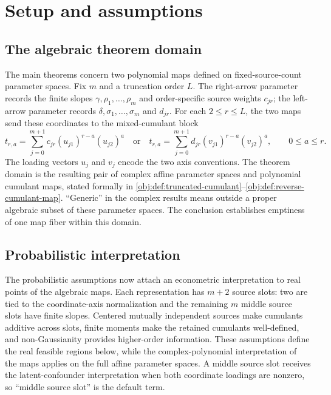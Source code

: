 \section{Setup and assumptions}

\subsection{The algebraic theorem domain}

The main theorems concern two polynomial maps defined on fixed-source-count parameter spaces. Fix \(m\) and a truncation order \(L\). The right-arrow parameter records the finite slopes \(\gamma,\rho_1,\ldots,\rho_m\) and order-specific source weights \(c_{jr}\); the left-arrow parameter records \(\delta,\sigma_1,\ldots,\sigma_m\) and \(d_{jr}\). For each \(2\le r\le L\), the two maps send these coordinates to the mixed-cumulant block
\[
t_{r,a}
=\sum_{j=0}^{m+1}c_{jr}(u_{j1})^{r-a}(u_{j2})^a
\quad\text{or}\quad
t_{r,a}
=\sum_{j=0}^{m+1}d_{jr}(v_{j1})^{r-a}(v_{j2})^a,
\qquad 0\le a\le r.
\]
The loading vectors \(u_j\) and \(v_j\) encode the two axis conventions. The theorem domain is the resulting pair of complex affine parameter spaces and polynomial cumulant maps, stated formally in \cref{obj:def:truncated-cumulant}--\cref{obj:def:reverse-cumulant-map}. ``Generic'' in the complex results means outside a proper algebraic subset of these parameter spaces. The conclusion establishes emptiness of one map fiber within this domain.

\subsection{Probabilistic interpretation}

The probabilistic assumptions now attach an econometric interpretation to real points of the algebraic maps. Each representation has \(m+2\) source slots: two are tied to the coordinate-axis normalization and the remaining \(m\) middle source slots have finite slopes. Centered mutually independent sources make cumulants additive across slots, finite moments make the retained cumulants well-defined, and non-Gaussianity provides higher-order information. These assumptions define the real feasible regions below, while the complex-polynomial interpretation of the maps applies on the full affine parameter spaces. A middle source slot receives the latent-confounder interpretation when both coordinate loadings are nonzero, so ``middle source slot'' is the default term.

